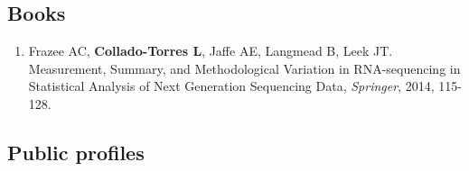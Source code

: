 \subsection{Books}
    \begin{enumerate}
        \item Frazee AC, \textbf{Collado-Torres L}, Jaffe AE, Langmead B, Leek JT. Measurement, Summary, and Methodological Variation in RNA-sequencing in Statistical Analysis of Next Generation Sequencing Data, \emph{Springer}, 2014, 115-128.
    \end{enumerate}
\subsection{Public profiles}

